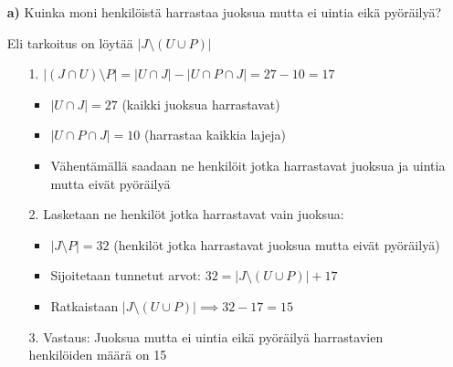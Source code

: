 \documentclass{article}
\begin{document}
\begin{itemize}
    \item[\textbf{a)}] Kuinka moni henkilöistä harrastaa juoksua mutta ei uintia eikä pyöräilyä?
      Eli tarkoitus on löytää $|J \setminus (U \cup P)|$
      \begin{itemize}
        \item[1.] $|(J \cap U) \setminus P| = |U \cap J| - |U \cap P \cap J| = 27 - 10 = 17$
        \begin{itemize}
            \item $|U \cap J| = 27$ (kaikki juoksua harrastavat)
            \item $|U \cap P \cap J| = 10$ (harrastaa kaikkia lajeja)
            \item Vähentämällä saadaan ne henkilöit jotka harrastavat juoksua ja uintia mutta eivät pyöräilyä
        \end{itemize}
        \item[2.]Lasketaan ne henkilöt jotka harrastavat vain juoksua:
        \begin{itemize}
            \item $|J \setminus P| = 32$ (henkilöt jotka harrastavat juoksua mutta eivät pyöräilyä)
            \item Sijoitetaan tunnetut arvot: $32 = |J \setminus (U \cup P)| + 17$
            \item Ratkaistaan $|J \setminus (U \cup P)| \implies 32 - 17 = 15$
        \end{itemize}
        \item[3.]Vastaus:
        Juoksua mutta ei uintia eikä pyöräilyä harrastavien henkilöiden määrä on 15
      \end{itemize}
      


\end{itemize}
\end{document}
